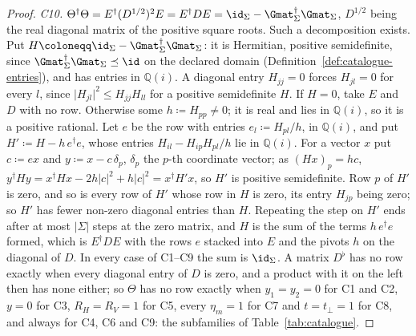 \begin{proof}
\emph{C10.} $\Theta^{\dagger}\Theta=E^{\dagger}(D^{1/2})^{2}E=E^{\dagger}DE
=\id_\Sigma-\Gmat_\Sigma^{\dagger}\Gmat_\Sigma$, $D^{1/2}$ being the real
diagonal matrix of the positive square roots. Such a decomposition exists. Put
$H\coloneqq\id_\Sigma-\Gmat_\Sigma^{\dagger}\Gmat_\Sigma$: it is Hermitian,
positive semidefinite, since $\Gmat_\Sigma^{\dagger}\Gmat_\Sigma\preceq\id$ on
the declared domain (Definition~\ref{def:catalogue-entries}), and has entries
in $\mathbb{Q}(i)$. A diagonal entry $H_{jj}=0$ forces $H_{jl}=0$ for every
$l$, since $\lvert H_{jl}\rvert^{2}\le H_{jj}H_{ll}$ for a positive
semidefinite $H$. If $H=0$, take $E$ and $D$ with no row. Otherwise some
$h\coloneqq H_{pp}\neq0$; it is real and lies in $\mathbb{Q}(i)$, so it is a
positive rational. Let $e$ be the row with entries $e_l\coloneqq H_{pl}/h$,
in $\mathbb{Q}(i)$, and put $H'\coloneqq H-h\,e^{\dagger}e$, whose entries
$H_{il}-H_{ip}H_{pl}/h$ lie in $\mathbb{Q}(i)$. For a vector $x$ put
$c\coloneqq ex$ and $y\coloneqq x-c\,\delta_p$, $\delta_p$ the $p$-th
coordinate vector; as $(Hx)_p=hc$,
$y^{\dagger}Hy=x^{\dagger}Hx-2h\lvert c\rvert^{2}+h\lvert c\rvert^{2}
=x^{\dagger}H'x$, so $H'$ is positive semidefinite. Row $p$ of $H'$ is zero,
and so is every row of $H'$ whose row in $H$ is zero, its entry $H_{jp}$
being zero; so $H'$ has fewer non-zero diagonal entries than $H$. Repeating
the step on $H'$ ends after at most $|\Sigma|$ steps at the zero matrix, and
$H$ is the sum of the terms $h\,e^{\dagger}e$ formed, which is $E^{\dagger}DE$
with the rows $e$ stacked into $E$ and the pivots $h$ on the diagonal of $D$.
In every case of C1--C9 the sum is $\id_\Sigma$. A matrix $D^{\flat}$ has no
row exactly when every diagonal entry of $D$ is zero, and a product with it
on the left then has none either; so $\Theta$ has no row exactly when
$y_1=y_2=0$ for C1 and C2, $y=0$ for C3, $R_H=R_V=1$ for C5, every
$\eta_m=1$ for C7 and $t=t_\perp=1$ for C8, and always for C4, C6 and C9:
the subfamilies of Table~\ref{tab:catalogue}.


\end{proof}
